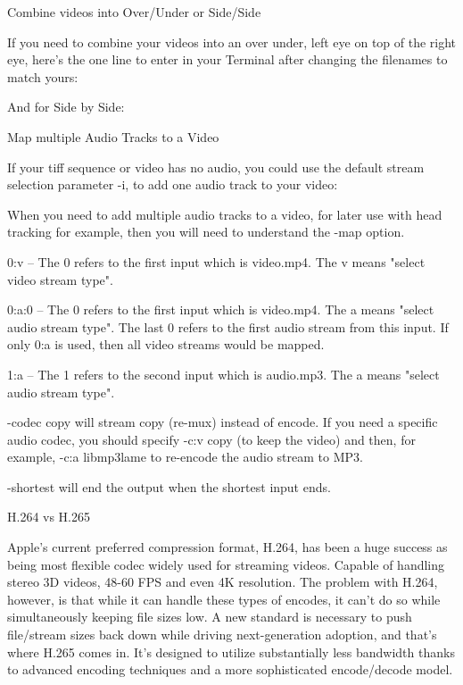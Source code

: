 \begin{fullwidth}
{\large Combine videos into Over/Under or Side/Side \par}

If you need to combine your videos into an over under, left eye on top of the right eye, here’s the one line to enter in your Terminal after changing the filenames to match yours:


And for Side by Side:



{\large Map multiple Audio Tracks to a Video \par}

If your tiff sequence or video has no audio, you could use the default stream selection parameter -i, to add one audio track to your video: 


When you need to add multiple audio tracks to a video, for later use with head tracking for example, then you will need to understand the -map option.


0:v – The 0 refers to the first input which is video.mp4. The v means "select video stream type".

0:a:0 – The 0 refers to the first input which is video.mp4. The a means "select audio stream type". The last 0 refers to the first audio stream from this input. If only 0:a is used, then all video streams would be mapped.

1:a – The 1 refers to the second input which is audio.mp3. The a means "select audio stream type".

-codec copy will stream copy (re-mux) instead of encode. If you need a specific audio codec, you should specify -c:v copy (to keep the video) and then, for example, -c:a libmp3lame to re-encode the audio stream to MP3.

-shortest will end the output when the shortest input ends.

{\large H.264 vs H.265 \par}

Apple’s current preferred compression format, H.264, has been a huge success as being most flexible codec widely used for streaming videos. Capable of handling stereo 3D videos, 48-60 FPS and even 4K resolution. The problem with H.264, however, is that while it can handle these types of encodes, it can’t do so while simultaneously keeping file sizes low. A new standard is necessary to push file/stream sizes back down while driving next-generation adoption, and that’s where H.265 comes in. It’s designed to utilize substantially less bandwidth thanks to advanced encoding techniques and a more sophisticated encode/decode model.


\end{fullwidth}
